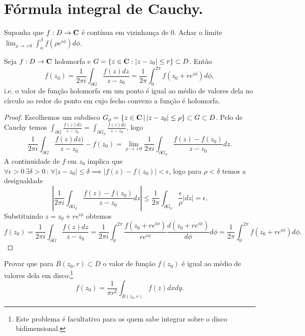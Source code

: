 \section{Fórmula integral de Cauchy.}

\begin{problema} Suponha que $f : D \to \mathbf{C}$ é contínua em vizinhança de $0$.
Achar o limite $\lim_{\rho \to +0} \int_\alpha^\beta f(\rho e^{i\phi}) d\phi$.
\end{problema}

\begin{teorema}
Seja $f : D \to \mathbf{C}$ holomorfa
e $G = \{ z\in\mathbf{C} : |z-z_0| \leq r \} \subset D$. Então
\begin{equation}
f(z_0) = \frac1{2\pi i} \int_{\partial G} \frac{f(z)dz}{z-z_0} 
= \frac1{2\pi} \int_0^{2\pi} f(z_0 + r e^{i\phi}) d\phi,
\end{equation}
i.e. o valor de função holomorfa em um ponto é igual ao médio de valores dela
no círculo ao redor do ponto em cujo fecho convexo a função é holomorfa.
\end{teorema}
\begin{proof}
Escolhemos um subdisco $G_\rho = \{ z\in\mathbf{C} \,|\, |z-z_0| \leq \rho \} \subset G \subset D$.
Pelo  de Cauchy temos
$\int_{\partial G} \frac{f(z) dz}{z-z_0} = \int_{\partial G_\rho} \frac{f(z) dz}{z-z_0}$,
logo
\begin{equation*}
\frac1{2\pi i} \int_{\partial G} \frac{f(z)dz)}{z-z_0} - f(z_0) = 
\lim_{\rho\to +0}   \frac1{2\pi i} \int_{\partial G_\rho} \frac{f(z)-f(z_0)}{z-z_0} dz. 
\end{equation*}
A continuidade de $f$ em $z_0$ implica que
$\forall \epsilon > 0 \, \exists\delta >0 \,:\, \forall |z-z_0|\leq\delta \implies |f(z)-f(z_0)| < \epsilon$,
logo para $\rho<\delta$ temos a desigualdade
\[ |\frac1{2\pi i} \int_{\partial G_\rho} \frac{f(z)-f(z_0)}{z-z_0} dz| 
\leq \frac1{2\pi} \int_{\partial G_\rho} \frac{\epsilon}{\rho} |dz| = \epsilon. \]
Substituindo $z = z_0 + r e^{i\phi}$ obtemos
\[ f(z_0) = \frac{1}{2\pi i} \int_{\partial G} \frac{f(z)dz}{z-z_0} = 
\frac{1}{2\pi i} \int_0^{2\pi} \frac{f(z_0 + r e^{i\phi})}{r e^{i\phi}} \frac{d(z_0+re^{i\phi})}{d\phi} d\phi
= \frac1{2\pi} \int_0^{2\pi} f(z_0 + r e^{i\phi}) d\phi. \]
\end{proof}

\begin{problema}
Provar que para $B(z_0,r)\subset D$ o valor de função $f(z_0)$ é igual ao médio de valores dela
em disco:\footnote{Este problema é facultativo para os quem sabe integrar sobre o disco bidimensional.}
\begin{equation}
f(z_0) = \frac{1}{\pi r^2} \int_{B(z_0,r)} f(z) dx dy.
\end{equation}
\end{problema}

